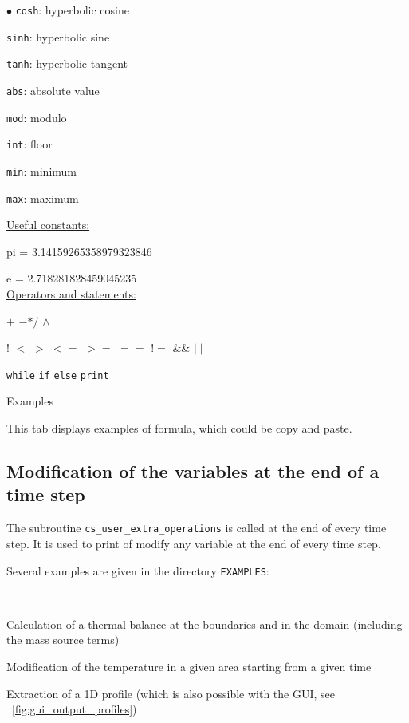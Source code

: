 {{{\begin{list}{$\bullet$}{}
\texttt{cosh}: hyperbolic cosine

\texttt{sinh}: hyperbolic sine

\texttt{tanh}: hyperbolic tangent

\texttt{abs}: absolute value

\texttt{mod}: modulo

\texttt{int}: floor

\texttt{min}: minimum

\texttt{max}: maximum

\underline{Useful constants:}

pi = 3.14159265358979323846

e = 2.718281828459045235\\


\underline{Operators and statements:}

$+$ \qquad$-$\qquad $*$\qquad $/$ \qquad$\wedge$

! \qquad $<$ \qquad $>$ \qquad $<=$ \qquad $>=$ \qquad $==$ \qquad $!=$ \qquad $\&\&$ \qquad $\mid\mid$

\texttt{while} \texttt{if} \texttt{else} \texttt{print}


\item Examples

This tab displays examples of formula, which could be copy and paste.

\end{list}
\subsection{Modification of the variables at the end of a time step}

The subroutine \texttt{cs\_user\_extra\_operations} is called at the end
of every time step. It is used to print of modify any variable at the end
of every time step.

Several examples are given in the directory \texttt{EXAMPLES}:
\begin{list}{-}{}
\item Calculation of a thermal balance at  the boundaries and in the
      domain (including the mass source terms)

\item Modification of the temperature in a given area starting from a
      given time

\item Extraction of a 1D profile (which is also possible with the GUI,
see \figurename~\ref{fig:gui_output_profiles})


\end{list}}}}
